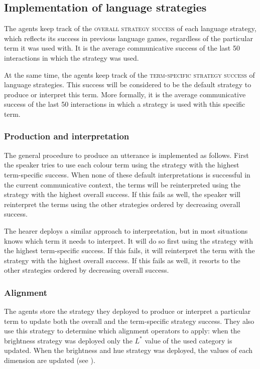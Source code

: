 \subsection{Implementation of language strategies}

The agents keep track of the \textsc{overall strategy success} of each
language strategy, which reflects its success in previous language
games, regardless of the particular term it was used with.  It is the
average communicative success of the last 50 interactions in which the
strategy was used.

At the same time, the agents keep track of the \textsc{term-specific
  strategy success} of language strategies. This success will be
considered to be the default strategy to produce or interpret this
term. More formally, it is the average communicative success of the
last 50 interactions in which a strategy is used with this specific
term.

\subsubsection{Production and interpretation}

The general procedure to produce an utterance is implemented as
follows. First the speaker tries to use each colour term using the
strategy with the highest term-specific success. When none of these
default interpretations is successful in the current communicative
context, the terms will be reinterpreted using the strategy with the
highest overall success. If this fails as well, the speaker will
reinterpret the terms using the other strategies ordered by
decreasing overall success.

The hearer deploys a similar approach to interpretation, but in most
situations knows which term it needs to interpret. It will do so first
using the strategy with the highest term-specific success. If this
fails, it will reinterpret the term with the strategy with the
highest overall success. If this fails as well, it resorts to the
other strategies ordered by decreasing overall success.

\subsubsection{Alignment}

The agents store the strategy they deployed to produce or interpret a
particular term to update both the overall and the term-specific
strategy success. They also use this strategy to determine which
alignment operators to apply: when the brightness strategy was
deployed only the $L^*$ value of the used category is updated. When
the brightness and hue strategy was deployed, the values of each
dimension are updated (see ).

